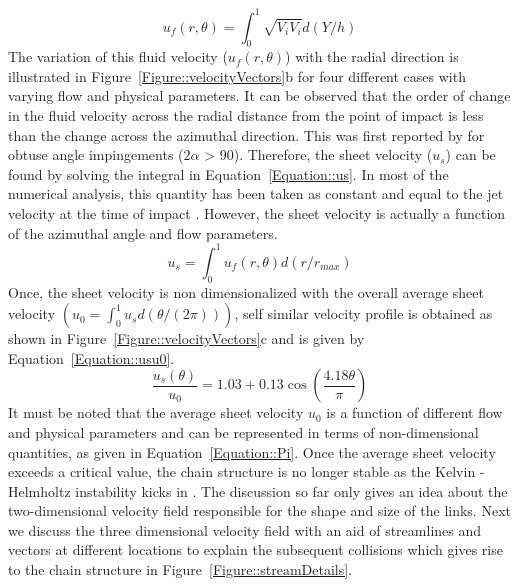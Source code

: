\documentclass[%
aip,
sd,%
amsmath,amssymb,
preprint,%
author-year,%
]{revtex4-1}
\begin{document}
\begin{equation}\label{Equation::uf}
u_f(r,\theta) = \int_{0}^{1}\sqrt{V_iV_i}d(Y/h)
\end{equation}
The variation of this fluid velocity ($u_f(r,\theta)$) with the radial direction is illustrated in Figure~\ref{Figure::velocityVectors}b for four different cases with varying flow and physical parameters. It can be observed that the order of change in the fluid velocity across the radial distance from the point of impact is less than the change across the azimuthal direction. This was first reported by \cite{choo2002velocity} for obtuse angle impingements ($2\alpha$ > 90). Therefore, the sheet velocity ($u_s$) can be found by solving the integral in Equation~\ref{Equation::us}. In most of the numerical analysis, this quantity has been taken as constant and equal to the jet velocity at the time of impact \citep{bush2004collision,bremond2006atomization,hasson1964thickness}. However, the sheet velocity is actually a function of the azimuthal angle and flow parameters. 
\begin{equation}\label{Equation::us}
u_s = \int_{0}^{1}u_f(r,\theta)d(r/r_{max})
\end{equation}   
Once, the sheet velocity is non dimensionalized with the overall average sheet velocity $\left(u_0 = \int_{0}^{1}u_sd(\theta/(2\pi))\right)$, self similar velocity profile is obtained as shown in Figure~\ref{Figure::velocityVectors}c and is given by Equation~\ref{Equation::usu0}.
\begin{equation}\label{Equation::usu0}
\frac{u_s(\theta)}{u_0} = 1.03 + 0.13\cos\left(\frac{4.18\theta}{\pi}\right)
\end{equation}
It must be noted that the average sheet velocity $u_0$ is a function of different flow and physical parameters and can be represented in terms of non-dimensional quantities, as given in Equation~\ref{Equation::Pi}. Once the average sheet velocity exceeds a critical value, the chain structure is no longer stable as the  Kelvin - Helmholtz instability kicks in \citep{villermaux2002life}. The discussion so far only gives an idea about the two-dimensional velocity field responsible for the shape and size of the links. Next we discuss the three dimensional velocity field with an aid of streamlines and vectors at different locations to explain the subsequent collisions which gives rise to the chain structure in Figure~\ref{Figure::streamDetails}.
\end{document}
